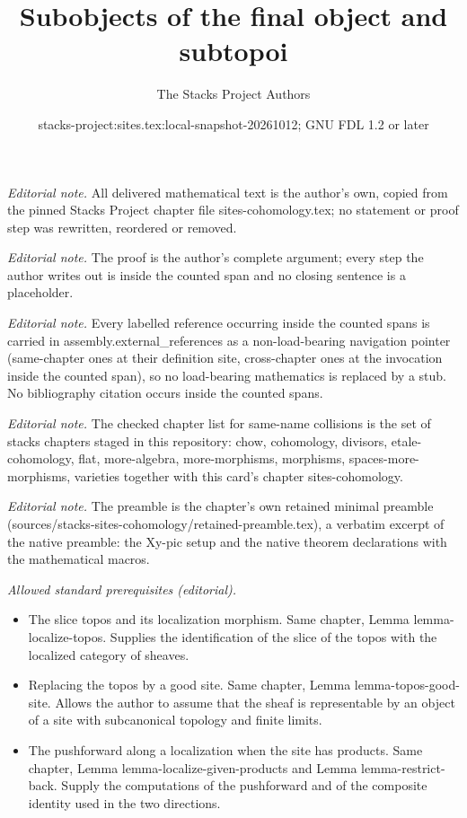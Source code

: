 \documentclass[10pt,a4paper]{amsart}
\title{Subobjects of the final object and subtopoi}
\author{The Stacks Project Authors}
\date{stacks-project:sites.tex:local-snapshot-20261012; GNU FDL 1.2 or later}
\theoremstyle{plain}
\theoremstyle{definition}
\theoremstyle{remark}
\numberwithin{equation}{subsection}
\begin{document}
\maketitle
\noindent\textit{Editorial note.} All delivered mathematical text is the author's own, copied from the pinned Stacks Project chapter file sites-cohomology.tex; no statement or proof step was rewritten, reordered or removed.\par\medskip
\noindent\textit{Editorial note.} The proof is the author's complete argument; every step the author writes out is inside the counted span and no closing sentence is a placeholder.\par\medskip
\noindent\textit{Editorial note.} Every labelled reference occurring inside the counted spans is carried in assembly.external\_references as a non-load-bearing navigation pointer (same-chapter ones at their definition site, cross-chapter ones at the invocation inside the counted span), so no load-bearing mathematics is replaced by a stub. No bibliography citation occurs inside the counted spans.\par\medskip
\noindent\textit{Editorial note.} The checked chapter list for same-name collisions is the set of stacks chapters staged in this repository: chow, cohomology, divisors, etale-cohomology, flat, more-algebra, more-morphisms, morphisms, spaces-more-morphisms, varieties together with this card's chapter sites-cohomology.\par\medskip
\noindent\textit{Editorial note.} The preamble is the chapter's own retained minimal preamble (sources/stacks-sites-cohomology/retained-preamble.tex), a verbatim excerpt of the native preamble: the Xy-pic setup and the native theorem declarations with the mathematical macros.\par\medskip
\noindent\textit{Allowed standard prerequisites (editorial).}\begin{itemize}
\item The slice topos and its localization morphism. Same chapter, Lemma lemma-localize-topos. Supplies the identification of the slice of the topos with the localized category of sheaves.
\item Replacing the topos by a good site. Same chapter, Lemma lemma-topos-good-site. Allows the author to assume that the sheaf is representable by an object of a site with subcanonical topology and finite limits.
\item The pushforward along a localization when the site has products. Same chapter, Lemma lemma-localize-given-products and Lemma lemma-restrict-back. Supply the computations of the pushforward and of the composite identity used in the two directions.
\end{itemize}\medskip
\end{document}
